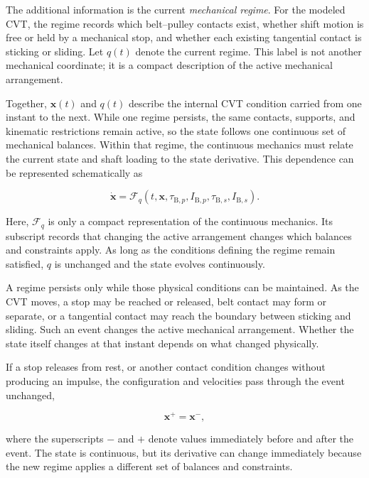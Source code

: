 \documentclass[11pt]{report}
\numberwithin{equation}{section}
\newcommand{\vect}[1]{\bm{#1}}
\begin{document}
The additional information is the current \emph{mechanical regime}. For the
modeled CVT, the regime records which belt--pulley contacts exist, whether
shift motion is free or held by a mechanical stop, and whether each existing
tangential contact is sticking or sliding. Let \(q(t)\) denote the current
regime. This label is not another mechanical coordinate; it is a compact
description of the active mechanical arrangement.

Together, \(\vect{x}(t)\) and \(q(t)\) describe the internal CVT condition
carried from one instant to the next. While one regime persists, the same
contacts, supports, and kinematic restrictions remain active, so the state
follows one continuous set of mechanical balances. Within that regime, the 
continuous mechanics must relate the current state and shaft loading to the 
state derivative. This dependence can be represented schematically as

\begin{equation}
\dot{\vect{x}}
=
\mathcal{F}_{q}
\!\left(
    t,\vect{x},
    \tau_{\mathrm{B},p},I_{\mathrm{B},p},
    \tau_{\mathrm{B},s},I_{\mathrm{B},s}
\right).
\label{eq:regime_dependent_evolution}
\end{equation}

Here, \(\mathcal{F}_{q}\) is only a compact representation of the continuous
mechanics. Its subscript records that changing the active arrangement changes
which balances and constraints apply. As long as the conditions defining the
regime remain satisfied, \(q\) is unchanged and the state evolves
continuously.

A regime persists only while those physical conditions can be maintained. As
the CVT moves, a stop may be reached or released, belt contact may form or
separate, or a tangential contact may reach the boundary between sticking and
sliding. Such an event changes the active mechanical arrangement. Whether the
state itself changes at that instant depends on what changed physically.

If a stop releases from rest, or another contact condition changes without
producing an impulse, the configuration and velocities pass through the event
unchanged,

\begin{equation}
    \vect{x}^{+}=\vect{x}^{-},
    \label{eq:nonimpulsive_regime_transition}
\end{equation}

where the superscripts \(-\) and \(+\) denote values immediately before and
after the event. The state is continuous, but its derivative can change
immediately because the new regime applies a different set of balances and
constraints.
\end{document}
